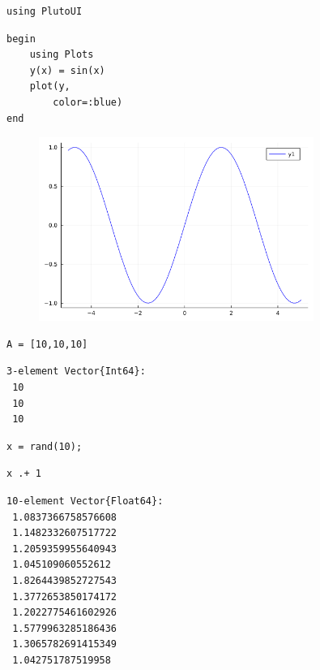 \newpage

\begin{lstlisting}[language=JuliaLocal, style=julia]
using PlutoUI
\end{lstlisting}

\begin{lstlisting}[language=JuliaLocal, style=julia]
begin
	using Plots
	y(x) = sin(x)
	plot(y,
		color=:blue)
end
\end{lstlisting}

\begin{figure}[H]
	\centering
	\includegraphics[width=0.8\textwidth]{./figures/examplepluto_figure1.png}
	\label{fig:examplepluto_figure1.png}

\end{figure}

\begin{lstlisting}[language=JuliaLocal, style=julia]
A = [10,10,10]
\end{lstlisting}

\begin{verbatim}
3-element Vector{Int64}:
 10
 10
 10
\end{verbatim}

\begin{lstlisting}[language=JuliaLocal, style=julia]
x = rand(10);
\end{lstlisting}

\begin{lstlisting}[language=JuliaLocal, style=julia]
x .+ 1
\end{lstlisting}

\begin{verbatim}
10-element Vector{Float64}:
 1.0837366758576608
 1.1482332607517722
 1.2059359955640943
 1.045109060552612
 1.8264439852727543
 1.3772653850174172
 1.2022775461602926
 1.5779963285186436
 1.3065782691415349
 1.042751787519958
\end{verbatim}

